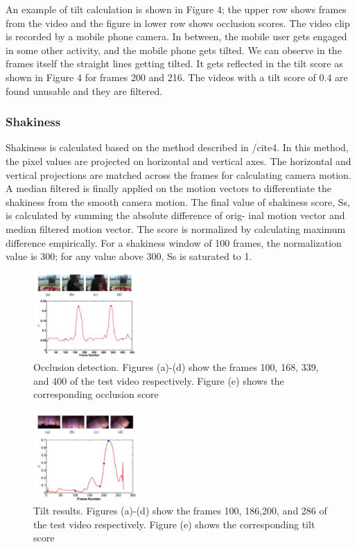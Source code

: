 \documentclass{sig-alternate}
\begin{document}
An example of tilt calculation is shown in Figure 4; the upper
row shows frames from the video and the figure in lower row shows
occlusion scores. The video clip is recorded by a mobile phone
camera. In between, the mobile user gets engaged in some other
activity, and the mobile phone gets tilted. We can observe in the
frames itself the straight lines getting tilted. It gets reflected in the
tilt score as shown in Figure 4 for frames 200 and 216. The videos
with a tilt score of 0.4 are found unusable and they are filtered.


\subsubsection{Shakiness}
Shakiness is calculated based on the method described in /cite{4}.
In this method, the pixel values are projected on horizontal and
vertical axes. The horizontal and vertical projections are matched
across the frames for calculating camera motion. A median filtered is finally applied on the motion vectors to differentiate the shakiness from the smooth camera motion. The final value of shakiness score, Ss, is calculated by summing the absolute difference of orig-
inal motion vector and median filtered motion vector. The score is normalized by calculating maximum difference empirically. For a shakiness window of 100 frames, the normalization value is 300;
for any value above 300, Ss is saturated to 1.

\begin{figure}[htp]
\centering
\includegraphics[width=4cm]{images/img3.png}
\caption{Occlusion detection. Figures (a)-(d) show the frames 100, 168, 339, and 400 of the test video respectively. Figure (e) shows the corresponding occlusion score}
\end{figure}

\begin{figure}[htp]
\centering
\includegraphics[width=4cm]{images/img4.png}
\caption{Tilt results. Figures (a)-(d) show the frames 100, 186,200, and 286 of the test video respectively. Figure (e) shows the corresponding tilt score}
\end{figure}
\end{document}
